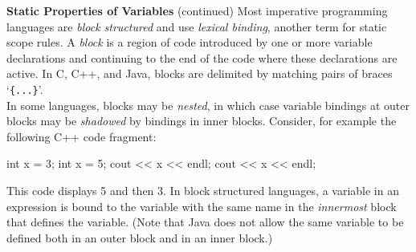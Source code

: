 \begin{minipage}[t]{\sw}
\slidenumber
\LARGE
{\bf Static Properties of Variables} (continued)\exx
Most imperative programming languages are {\em block structured}
and use {\em lexical binding}, another term for static scope rules.
A {\em block} is a region of code
introduced by one or more variable declarations
and continuing to the end of the code
where these declarations are active.
In C, C++, and Java, blocks are delimited by matching pairs
of braces `\verb'{...}''.\\[2ex]
In some languages, blocks may be {\em nested}, in which case
variable bindings at outer blocks may be {\em shadowed}
by bindings in inner blocks.
Consider, for example the following C++ code fragment:
{\Large
\begin{qv}
{ int x = 3;
   { int x = 5;
     cout << x << endl;
   }
   cout << x << endl;
}
\end{qv}
}
This code displays 5 and then 3.\exx
In block structured languages,
a variable in an expression is bound
to the variable with the same name
in the {\em innermost} block that defines the variable.
(Note that Java does not allow the same variable to be defined
both in an outer block and in an inner block.)
\end{minipage}
\clearpage
